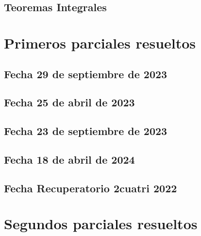 \documentclass[10pt, a4paper]{report}
\begin{document}
       \section{Teoremas Integrales}
            







    \chapter{Primeros parciales resueltos}
        \section{Fecha 29 de septiembre de 2023}
            

    
    
        \newpage
        \section{Fecha 25 de abril de 2023}
            





            \newpage
        \section{Fecha 23 de septiembre de 2023}
            


            \newpage
        \section{Fecha 18 de abril de 2024}
            
            


        \newpage
        \section{Fecha Recuperatorio 2cuatri 2022}
            



        \newpage
    \chapter{Segundos parciales resueltos}
\end{document}
